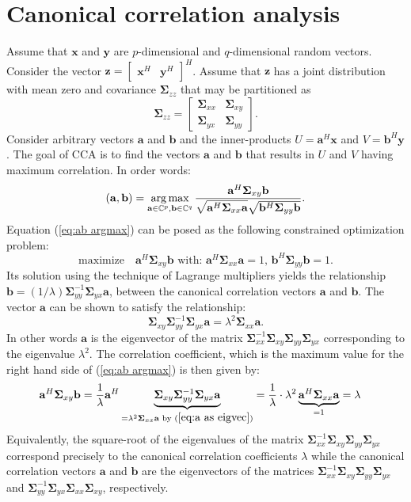 \documentclass[conference]{IEEEtran}
\newcommand{\x}{\mathbf{x}}
\newcommand{\y}{\mathbf{y}}
\newcommand{\z}{\mathbf{z}}
\newcommand{\Sz}{\mathbf{\Sigma}_{zz}}
\newcommand{\Sx}{\mathbf{\Sigma}_{xx}}
\newcommand{\Sy}{\mathbf{\Sigma}_{yy}}
\newcommand{\Sxy}{\mathbf{\Sigma}_{xy}}
\newcommand{\Syx}{\mathbf{\Sigma}_{yx}}
\newcommand{\aaa}{\mathbf{a}}
\newcommand{\bbb}{\mathbf{b}}
\newcommand{\argmax}{\operatornamewithlimits{\arg \max}}
\begin{document}
\section{Canonical correlation analysis}\label{sec:cca}
Assume that $\x$ and $\y$ are $p$-dimensional and $q$-dimensional random vectors. Consider the vector $\z = \begin{bmatrix}
\x^{H} &
\y^{H}
\end{bmatrix}^{H}
$. Assume that $\z$ has a joint distribution with mean zero and covariance $\Sz$ that may be partitioned as
\[
\Sz = \begin{bmatrix}
\Sx & \Sxy \\
\Syx & \Sy
\end{bmatrix}.
\]
Consider arbitrary vectors $\aaa$ and $\bbb$ and the inner-products $U = \aaa^{H}\x$ and $V = \bbb^{H}\y$. The goal of CCA is to find the vectors $\aaa$ and $\bbb$ that results in $U$ and $V$ having maximum correlation. In order words:
\begin{equation}\label{eq:ab argmax}
(\aaa,\bbb) = \argmax_{\aaa \in \mathbb{C}^{p}, \bbb \in \mathbb{C}^{q}}  \dfrac{\aaa^{H}\Sxy \bbb}{\sqrt{\aaa^{H} \Sx \aaa}\sqrt{\bbb^{H} \Sy \bbb}}.
\end{equation}
Equation (\ref{eq:ab argmax}) can be posed as the following constrained optimization problem:
\begin{equation*}
\textrm{maximize} \quad \aaa^{H}\Sxy\bbb \textrm{ with: } \aaa^{H}\Sx \aaa = 1, \, \bbb^{H}\Sy \bbb = 1.
\end{equation*}
Its  solution using the technique of Lagrange multipliers yields the relationship $\bbb = (1/\lambda) \Sy^{-1} \Syx \aaa$, between the canonical correlation vectors $\aaa$ and $\bbb$. The vector $\aaa$ can be shown to satisfy the relationship:
\begin{equation}\label{eq:a as eigvec}
\Sxy \Sy^{-1} \Syx \aaa = \lambda^{2} \Sx \aaa.
\end{equation}
In other words $\aaa$ is the eigenvector of the matrix $\Sx^{-1} \Sxy \Sy \Syx $ corresponding to the eigenvalue $\lambda^{2}$. The correlation coefficient, which is the maximum value for the right hand side of (\ref{eq:ab argmax}) is then given by:
\begin{align*}
\aaa^{H}\Sxy \bbb &= \dfrac{1}{\lambda} \aaa^{H}\underbrace{\Sxy \Sy^{-1} \Syx \aaa}_{= \lambda^{2} \Sx \aaa \textrm{ by } (\ref{eq:a as eigvec})} = \dfrac{1}{\lambda} \cdot \lambda^{2}  \underbrace{\aaa^{H} \Sx \aaa}_{=1} = \lambda
\end{align*}
Equivalently, the square-root of the eigenvalues of the matrix $\Sx^{-1} \Sxy \Sy \Syx$ correspond precisely to the canonical correlation coefficients $\lambda$ while the canonical correlation vectors $\aaa$ and $\bbb$ are the eigenvectors of the matrices $\Sx^{-1} \Sxy \Sy \Syx$ and  $\Sy^{-1} \Syx \Sx \Sxy$, respectively.
\end{document}
